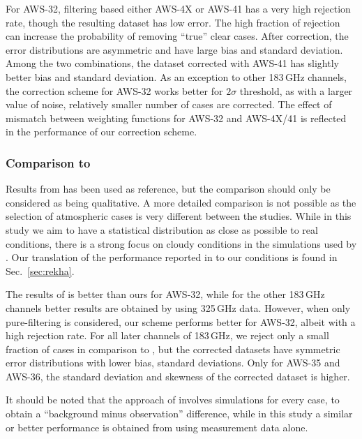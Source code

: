 \documentclass[12pt]{article}
\begin{document}
For AWS-32, filtering based either AWS-4X or AWS-41 has a very high rejection rate, though the resulting dataset has low error. The high fraction of rejection can increase the probability of removing ``true'' clear cases. After correction, the error distributions are asymmetric and have large bias and standard deviation. Among the two combinations, the dataset corrected with AWS-41 has slightly better bias and standard deviation. As an exception to other 183\,GHz channels, the correction scheme for AWS-32 works better for $2\sigma$ threshold, as with a larger value of noise, relatively smaller number of cases are corrected. The effect of mismatch between weighting functions for AWS-32 and AWS-4X/41 is reflected in the performance of our correction scheme.

\subsubsection{Comparison to \citet{rekha2012potential}}
%
Results from \citet{rekha2012potential} has been used as reference, but the
comparison should only be considered as being qualitative. A more detailed
comparison is not possible as the selection of atmospheric cases is very
different between the studies. While in this study we aim to have a statistical
distribution as close as possible to real conditions, there is a strong focus on
cloudy conditions in the simulations used by \citet{rekha2012potential}. Our
translation of the performance reported in \citet{rekha2012potential} to our
conditions is found in Sec.~\ref{sec:rekha}.

The results of \citet{rekha2012potential} is better than ours for AWS-32, while for the other 183\,GHz channels better results are obtained by using 325\,GHz data. However, when only pure-filtering is considered, our scheme performs better for AWS-32, albeit with a high rejection rate. For all later channels of 183\,GHz,  we reject only a small fraction of cases in comparison to \citet{rekha2012potential}, but the corrected datasets have symmetric error distributions with lower bias, standard deviations. Only for AWS-35 and AWS-36, the standard deviation and skewness of the corrected dataset is higher. 

It should be noted that the approach of \citet{rekha2012potential} involves
simulations for every case, to obtain a ``background minus observation''
difference, while in this study a similar or better performance is obtained
from using measurement data alone. 
\end{document}
